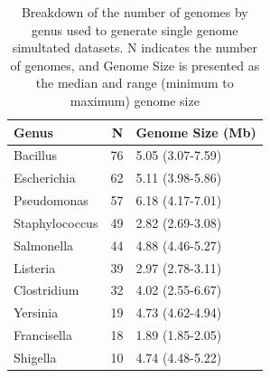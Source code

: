 \documentclass[fleqn,10pt,lineno]{wlpeerj}\usepackage[]{graphicx}\usepackage[]{color}
\newenvironment{knitrout}{}{} %
\begin{document}
\begin{knitrout}
\color{fgcolor}\begin{table}

\caption{Breakdown of the number of genomes by genus used to generate single genome simultated datasets. N indicates the number of genomes, and Genome Size is presented as the median and range (minimum to maximum) genome size}
\centering
\begin{tabular}[t]{l|r|l}
\hline
Genus & N & Genome Size (Mb)\\
\hline
Bacillus & 76 & 5.05 (3.07-7.59)\\
\hline
Escherichia & 62 & 5.11 (3.98-5.86)\\
\hline
Pseudomonas & 57 & 6.18 (4.17-7.01)\\
\hline
Staphylococcus & 49 & 2.82 (2.69-3.08)\\
\hline
Salmonella & 44 & 4.88 (4.46-5.27)\\
\hline
Listeria & 39 & 2.97 (2.78-3.11)\\
\hline
Clostridium & 32 & 4.02 (2.55-6.67)\\
\hline
Yersinia & 19 & 4.73 (4.62-4.94)\\
\hline
Francisella & 18 & 1.89 (1.85-2.05)\\
\hline
Shigella & 10 & 4.74 (4.48-5.22)\\
\hline
\end{tabular}
\end{table}


\end{knitrout}
\end{document}
